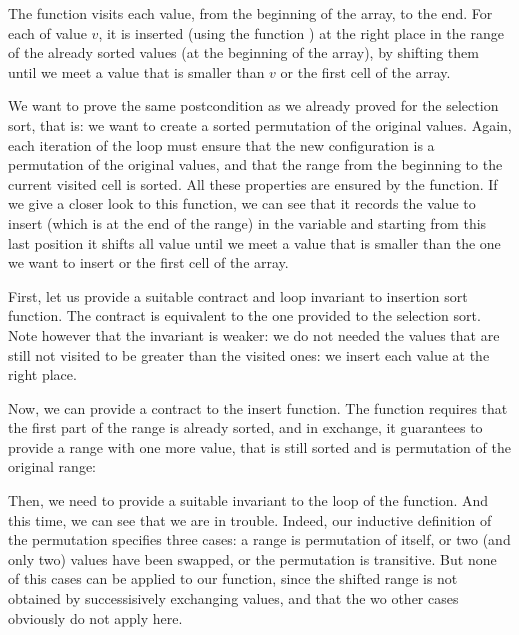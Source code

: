 

The  function visits each value, from the beginning
of the array, to the end. For each of value $v$, it is inserted (using the
function ) at the right place in the range of the already
sorted values (at the beginning of the array), by shifting them until we meet a
value that is smaller than $v$ or the first cell of the array.




We want to prove the same postcondition as we already proved for the selection
sort, that is: we want to create a sorted permutation of the original values.
Again, each iteration of the loop must ensure that the new configuration is a
permutation of the original values, and that the range from the beginning to
the current visited cell is sorted. All these properties are ensured by the
 function. If we give a closer look to this function, we can
see that it records the value to insert (which is at the end of the range) in
the variable  and starting from this last position it shifts
all value until we meet a value that is smaller than the one we want to insert
or the first cell of the array.




First, let us provide a suitable contract and loop invariant to insertion sort
function. The contract is equivalent to the one provided to the selection sort.
Note however that the invariant is weaker: we do not needed the values that are
still not visited to be greater than the visited ones: we insert each value at
the right place.






Now, we can provide a contract to the insert function. The function requires
that the first part of the range is already sorted, and in exchange, it
guarantees to provide a range with one more value, that is still sorted and
is permutation of the original range:






Then, we need to provide a suitable invariant to the loop of the
 function. And this time, we can see that we are in trouble.
Indeed, our inductive definition of the permutation specifies three cases: a
range is permutation of itself, or two (and only two) values have been swapped,
or the permutation is transitive. But none of this cases can be applied to our 
 function, since the shifted range is not obtained by
successisively exchanging values, and that the wo other cases obviously do not
apply here.



